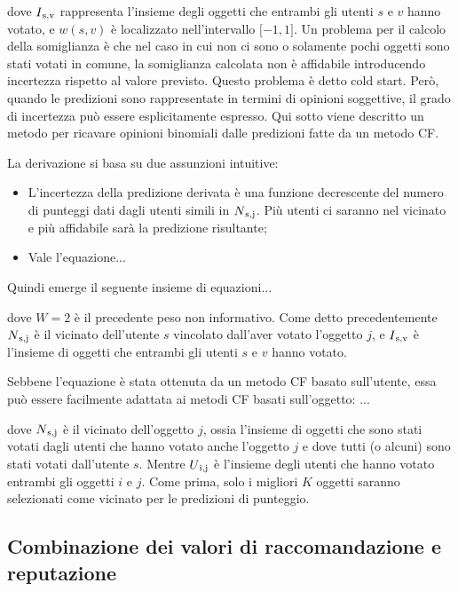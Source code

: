 \documentclass{report}
\begin{document}
	dove $I\textsubscript{s,v}$ rappresenta l'insieme degli oggetti che entrambi gli utenti $s$
	e $v$ hanno votato, e $w(s,v)$ è localizzato nell'intervallo ${[}-1,1{]}$. Un
	problema per il calcolo della somiglianza è che nel caso in cui non ci
	sono o solamente pochi oggetti sono stati votati in comune, la
	somiglianza calcolata non è affidabile introducendo incertezza rispetto
	al valore previsto. Questo problema è detto cold start. Però, quando le
	predizioni sono rappresentate in termini di opinioni soggettive, il
	grado di incertezza può essere esplicitamente espresso. Qui sotto viene
	descritto un metodo per ricavare opinioni binomiali dalle predizioni
	fatte da un metodo CF.
	
	La derivazione si basa su due assunzioni intuitive:
	
	\begin{itemize}
		\item
		L'incertezza della predizione derivata è una funzione decrescente del
		numero di punteggi dati dagli utenti simili in $N\textsubscript{s,j}$. Più utenti ci
		saranno nel vicinato e più affidabile sarà la predizione risultante;
		\item
		Vale l'equazione...
	\end{itemize}
	
	Quindi emerge il seguente insieme di equazioni...
	
	dove $W = 2$ è il precedente peso non informativo. Come detto
	precedentemente $N\textsubscript{s,j}$ è il vicinato dell'utente $s$ vincolato dall'aver
	votato l'oggetto $j$, e $I\textsubscript{s,v}$ è l'insieme di oggetti che entrambi gli
	utenti $s$ e $v$ hanno votato.
	
	Sebbene l'equazione è stata ottenuta da un metodo CF basato sull'utente,
	essa può essere facilmente adattata ai metodi CF basati sull'oggetto:
	...
	
	dove $N\textsubscript{s,j}$ è il vicinato dell'oggetto $j$, ossia l'insieme di oggetti che
	sono stati votati dagli utenti che hanno votato anche l'oggetto $j$ e dove
	tutti (o alcuni) sono stati votati dall'utente $s$. Mentre $U\textsubscript{i,j}$ è
	l'insieme degli utenti che hanno votato entrambi gli oggetti $i$ e $j$. Come
	prima, solo i migliori $K$ oggetti saranno selezionati come vicinato per
	le predizioni di punteggio.
	
	\hypertarget{header-n134}{%
		\subsection{Combinazione dei valori di raccomandazione e
			reputazione}\label{header-n134}}
	
\end{document}
